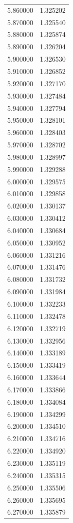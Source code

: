 \begin{tabular}{rr}
5.860000 & 1.325202 \\
5.870000 & 1.325540 \\
5.880000 & 1.325874 \\
5.890000 & 1.326204 \\
5.900000 & 1.326530 \\
5.910000 & 1.326852 \\
5.920000 & 1.327170 \\
5.930000 & 1.327484 \\
5.940000 & 1.327794 \\
5.950000 & 1.328101 \\
5.960000 & 1.328403 \\
5.970000 & 1.328702 \\
5.980000 & 1.328997 \\
5.990000 & 1.329288 \\
6.000000 & 1.329575 \\
6.010000 & 1.329858 \\
6.020000 & 1.330137 \\
6.030000 & 1.330412 \\
6.040000 & 1.330684 \\
6.050000 & 1.330952 \\
6.060000 & 1.331216 \\
6.070000 & 1.331476 \\
6.080000 & 1.331732 \\
6.090000 & 1.331984 \\
6.100000 & 1.332233 \\
6.110000 & 1.332478 \\
6.120000 & 1.332719 \\
6.130000 & 1.332956 \\
6.140000 & 1.333189 \\
6.150000 & 1.333419 \\
6.160000 & 1.333644 \\
6.170000 & 1.333866 \\
6.180000 & 1.334084 \\
6.190000 & 1.334299 \\
6.200000 & 1.334510 \\
6.210000 & 1.334716 \\
6.220000 & 1.334920 \\
6.230000 & 1.335119 \\
6.240000 & 1.335315 \\
6.250000 & 1.335506 \\
6.260000 & 1.335695 \\
6.270000 & 1.335879 \\

\end{tabular}
